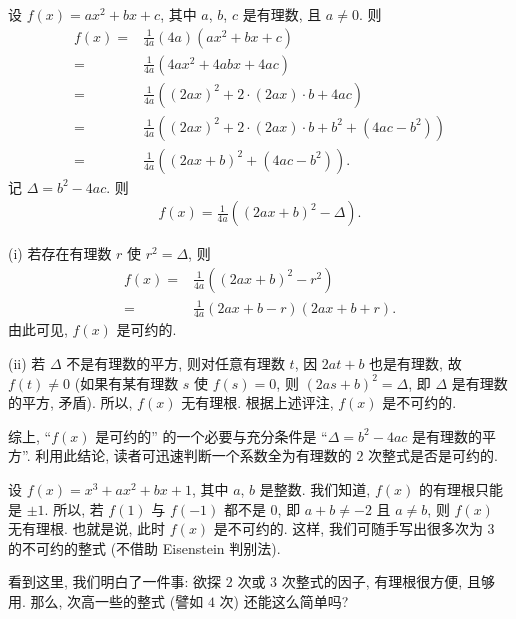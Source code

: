 \begin{example}
    设 $f(x) = ax^2 + bx + c$, 其中 $a$, $b$, $c$ 是有理数, 且 $a \neq 0$. 则
    \begin{align*}
        f(x)
        = {} & \frac{1}{4a} (4a) (ax^2 + bx + c)                                  \\
        = {} & \frac{1}{4a} (4ax^2 + 4abx + 4ac)                                  \\
        = {} & \frac{1}{4a} ((2ax)^2 + 2 \cdot (2ax) \cdot b + 4ac)               \\
        = {} & \frac{1}{4a} ((2ax)^2 + 2 \cdot (2ax) \cdot b + b^2 + (4ac - b^2)) \\
        = {} & \frac{1}{4a} ((2ax + b)^2 + (4ac - b^2)).
    \end{align*}
    记 $\Delta = b^2 - 4ac$. 则
    \begin{align*}
        f(x) = \frac{1}{4a} ((2ax + b)^2 - \Delta).
    \end{align*}

    (i) 若存在有理数 $r$ 使 $r^2 = \Delta$, 则
    \begin{align*}
        f(x)
        = {} & \frac{1}{4a} ((2ax + b)^2 - r^2)          \\
        = {} & \frac{1}{4a} (2ax + b - r) (2ax + b + r).
    \end{align*}
    由此可见, $f(x)$ 是可约的.

    (ii) 若 $\Delta$ 不是有理数的平方, 则对任意有理数 $t$, 因 $2at + b$ 也是有理数, 故 $f(t) \neq 0$ (如果有某有理数 $s$ 使 $f(s) = 0$, 则 $(2as + b)^2 = \Delta$, 即 $\Delta$ 是有理数的平方, 矛盾). 所以, $f(x)$ 无有理根. 根据上述评注, $f(x)$ 是不可约的.

    综上, ``$f(x)$ 是可约的'' 的一个必要与充分条件是 ``$\Delta = b^2 - 4ac$ 是有理数的平方''. 利用此结论, 读者可迅速判断一个系数全为有理数的 $2$ 次整式是否是可约的.
\end{example}

\begin{example}
    设 $f(x) = x^3 + ax^2 + bx + 1$, 其中 $a$, $b$ 是整数. 我们知道, $f(x)$ 的有理根只能是 $\pm 1$. 所以, 若 $f(1)$ 与 $f(-1)$ 都不是 $0$, 即 $a + b \neq -2$ 且 $a \neq b$, 则 $f(x)$ 无有理根. 也就是说, 此时 $f(x)$ 是不可约的. 这样, 我们可随手写出很多次为 $3$ 的不可约的整式 (不借助 Eisenstein 判别法).
\end{example}

看到这里, 我们明白了一件事: 欲探 $2$ 次或 $3$ 次整式的因子, 有理根很方便, 且够用. 那么, 次高一些的整式 (譬如 $4$ 次) 还能这么简单吗?

